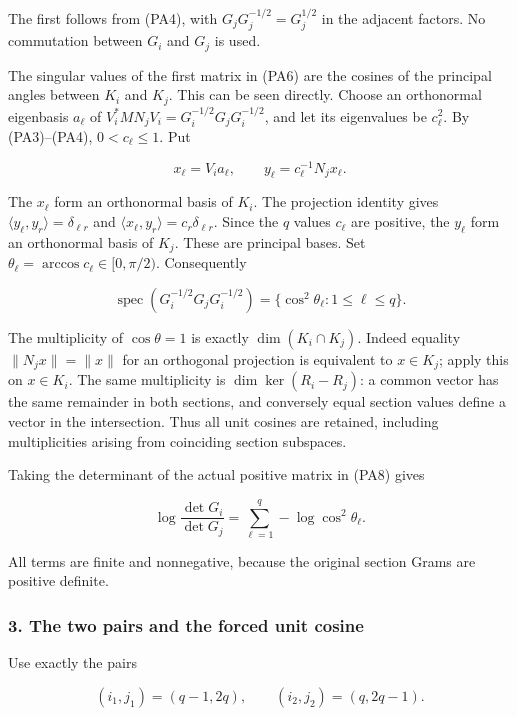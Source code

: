 \documentclass{article}
\begin{document}
The first follows from (PA4), with \(G_jG_j^{-1/2}=G_j^{1/2}\) in the adjacent factors. No commutation between \(G_i\) and \(G_j\) is used.

The singular values of the first matrix in (PA6) are the cosines of the principal angles between \(K_i\) and \(K_j\). This can be seen directly. Choose an orthonormal eigenbasis \(a_\ell\) of \(V_i^*MN_jV_i=G_i^{-1/2}G_jG_i^{-1/2}\), and let its eigenvalues be \(c_\ell^2\). By (PA3)--(PA4), \(0<c_\ell\le1\). Put

\[
x_\ell=V_i a_\ell,\qquad
y_\ell=c_\ell^{-1}N_jx_\ell.
\tag{PA7}
\]

The \(x_\ell\) form an orthonormal basis of \(K_i\). The projection identity gives \(\langle y_\ell,y_r\rangle=\delta_{\ell r}\) and \(\langle x_\ell,y_r\rangle=c_r\delta_{\ell r}\). Since the \(q\) values \(c_\ell\) are positive, the \(y_\ell\) form an orthonormal basis of \(K_j\). These are principal bases. Set \(\theta_\ell=\arccos c_\ell\in[0,\pi/2)\). Consequently

\[
\boxed{\operatorname{spec}(G_i^{-1/2}G_jG_i^{-1/2})
=\{\cos^2\theta_\ell:1\le\ell\le q\}.}
\tag{PA8}
\]

The multiplicity of \(\cos\theta=1\) is exactly \(\dim(K_i\cap K_j)\). Indeed equality \(\|N_jx\|=\|x\|\) for an orthogonal projection is equivalent to \(x\in K_j\); apply this on \(x\in K_i\). The same multiplicity is \(\dim\ker(R_i-R_j)\): a common vector has the same remainder in both sections, and conversely equal section values define a vector in the intersection. Thus all unit cosines are retained, including multiplicities arising from coinciding section subspaces.

Taking the determinant of the actual positive matrix in (PA8) gives

\[
\log\frac{\det G_i}{\det G_j}
=\sum_{\ell=1}^q-\log\cos^2\theta_\ell.
\tag{PA9}
\]

All terms are finite and nonnegative, because the original section Grams are positive definite.

\subsubsection{3. The two pairs and the forced unit cosine}\label{endpoint-principal_angle_volume_review--the-two-pairs-and-the-forced-unit-cosine}

Use exactly the pairs

\[
(i_1,j_1)=(q-1,2q),\qquad
(i_2,j_2)=(q,2q-1).
\tag{PA10}
\]
\end{document}
